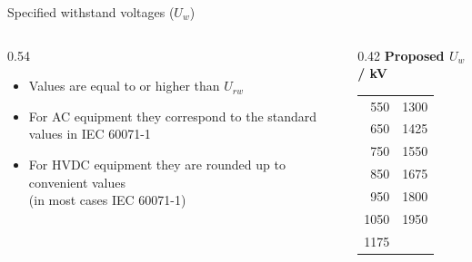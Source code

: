 \begin{frame}{Specified withstand voltages ($U_w$)}
  \begin{columns}[c,onlytextwidth]
    \begin{column}{0.54\textwidth}
      \begin{itemize}
        \setlength{\itemsep}{0.4em}
        \item Values are equal to or higher than $U_{rw}$
        \item For AC equipment they correspond to the standard values in
              IEC 60071-1
        \item For HVDC equipment they are rounded up to convenient values\\
              (in most cases IEC 60071-1)
      \end{itemize}
    \end{column}
    \begin{column}{0.42\textwidth}
      \centering
      \renewcommand{\arraystretch}{1.15}
      \textbf{Proposed $U_w$ / kV}\\[0.3em]
      \begin{tabular}{@{}rr@{}}
        \hline
        550  & 1300 \\
        650  & 1425 \\
        750  & 1550 \\
        850  & 1675 \\
        950  & 1800 \\
        1050 & 1950 \\
        1175 &      \\
        \hline
      \end{tabular}
    \end{column}
  \end{columns}
\end{frame}

